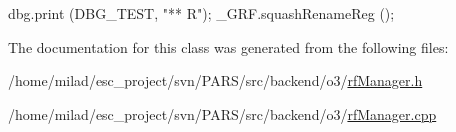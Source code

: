 \begin{DoxyCode}
                                    {
    dbg.print (DBG_TEST, "** %
      R");
    _GRF.squashRenameReg ();
}
\end{DoxyCode}


The documentation for this class was generated from the following files:\begin{DoxyCompactItemize}
\item 
/home/milad/esc\_\-project/svn/PARS/src/backend/o3/\hyperlink{o3_2rfManager_8h}{rfManager.h}\item 
/home/milad/esc\_\-project/svn/PARS/src/backend/o3/\hyperlink{o3_2rfManager_8cpp}{rfManager.cpp}\end{DoxyCompactItemize}
